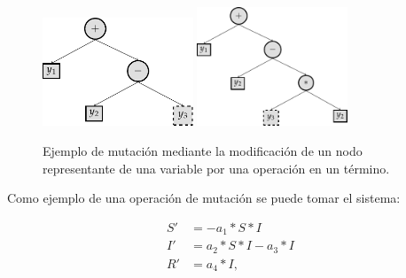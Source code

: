 \begin{itemize}
\begin{itemize}
\begin{center}
                        \begin{figure}[h]
                            \centering
                            \includegraphics[width=0.4\textwidth]{"figures/mutation_change_variable_by_node_1.pdf"}
                            \qquad
                            \includegraphics[width=0.4\textwidth]{"figures/mutation_change_variable_by_node_2.pdf"}
                            \caption{Ejemplo de mutación mediante la modificación de un nodo representante de una variable por una operación en un término.}
                            \label{tikzpicture:mutation_change_variable_by_node}
                        \end{figure}
                    \end{center}
          \end{itemize}
\end{itemize}

Como ejemplo de una operación de mutación se puede tomar el sistema:

\begin{align*}
    S' & = - a_1 * S * I         \\
    I' & = a_2 * S * I - a_3 * I \\
    R' & = a_4 * I,
\end{align*}

